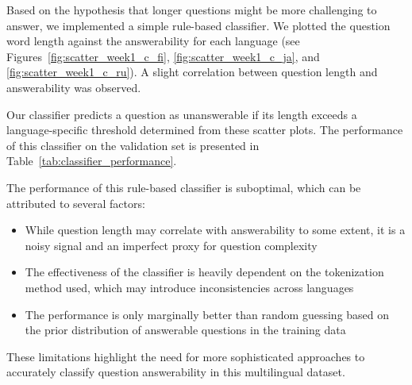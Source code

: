 \documentclass[11pt]{article}
\begin{document}
\begin{enumerate}
    Based on the hypothesis that longer questions might be more challenging to answer, we implemented a simple rule-based classifier. We plotted the question word length against the answerability for each language (see Figures~\ref{fig:scatter_week1_c_fi}, \ref{fig:scatter_week1_c_ja}, and \ref{fig:scatter_week1_c_ru}). A slight correlation between question length and answerability was observed.

    Our classifier predicts a question as unanswerable if its length exceeds a language-specific threshold determined from these scatter plots. The performance of this classifier on the validation set is presented in Table~\ref{tab:classifier_performance}.

    \begin{table}[ht]
        \centering
        \caption{Performance metrics of the rule-based classifier on the validation set}
        \label{tab:classifier_performance}
    \end{table}

    The performance of this rule-based classifier is suboptimal, which can be attributed to several factors:
    \begin{itemize}
        \item While question length may correlate with answerability to some extent, it is a noisy signal and an imperfect proxy for question complexity
        \item The effectiveness of the classifier is heavily dependent on the tokenization method used, which may introduce inconsistencies across languages
        \item The performance is only marginally better than random guessing based on the prior distribution of answerable questions in the training data
    \end{itemize}

    These limitations highlight the need for more sophisticated approaches to accurately classify question answerability in this multilingual dataset.

\end{enumerate}
\end{document}
